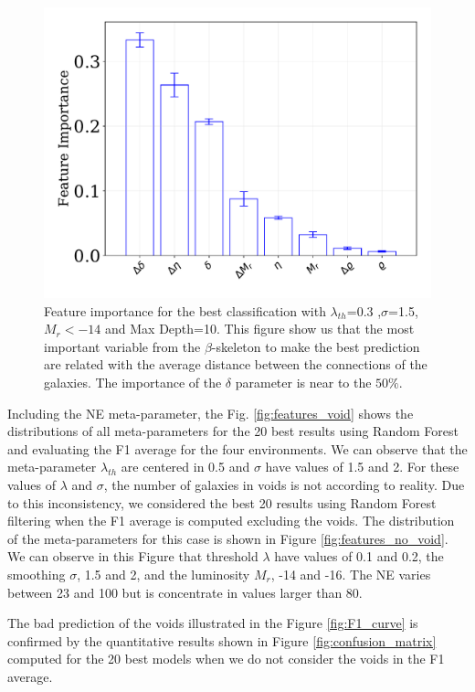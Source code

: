 \documentclass[usenatbib]{mnras}
\begin{document}
\begin{figure}
\centering
    \includegraphics[scale=0.4]{Figs/p_features_importance_20.pdf}  
    \caption{Feature importance for the best classification with
      $\lambda_{th}$=0.3 ,$\sigma$=1.5, $M_{r}<-14$ and Max
      Depth=10. This figure show us that the most important variable
      from the $\beta$-skeleton to make the best prediction are
      related with the average distance between the connections of the
      galaxies. The importance of the $\delta$ parameter is near to
      the $50\%$.} 
    \label{fig:feature_importance}     
\end{figure}

Including the NE meta-parameter, the Fig. \ref{fig:features_void}
shows the distributions of all meta-parameters for the 20 best results
using Random Forest and evaluating the F1 average for the four
environments. We can observe that the meta-parameter $\lambda_{th}$
are centered in 0.5 and $\sigma$ have values of 1.5 and 2. For these
values of $\lambda$ and $\sigma$, the number of galaxies in voids is
not according to reality. Due to this inconsistency, we considered the
best 20 results using Random Forest filtering when the F1 average is
computed excluding the voids. The distribution of the meta-parameters
for this case is shown in Figure \ref{fig:features_no_void}. We can
observe in this Figure that threshold $\lambda$ have values of 0.1 and
0.2, the smoothing $\sigma$, 1.5 and 2, and the luminosity $M_r$, -14
and -16. The NE varies between 23 and 100 but is concentrate in values
larger than 80. 

The bad prediction of the voids illustrated in the Figure
\ref{fig:F1_curve} is confirmed by the quantitative results shown in
Figure \ref{fig:confusion_matrix} computed for the 20 best models when
we do not consider the voids in the F1 average.  
\end{document}
